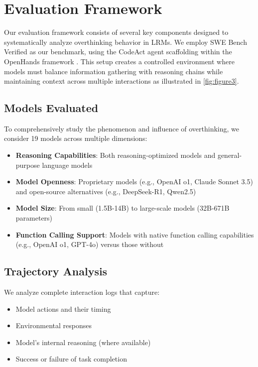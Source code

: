 \section{Evaluation Framework}
\label{sec:eval_framework}

Our evaluation framework consists of several key components designed to systematically analyze overthinking behavior in LRMs. We employ SWE Bench Verified \cite{jimenez2024swebenchlanguagemodelsresolve, swebench_verified} as our benchmark, using the CodeAct agent scaffolding \cite{wang2024executablecodeactionselicit} within the OpenHands framework \cite{wang2024openhandsopenplatformai}. This setup creates a controlled environment where models must balance information gathering with reasoning chains while maintaining context across multiple interactions as illustrated in \autoref{fig:figure3}.

\subsection{Models Evaluated}
To comprehensively study the phenomenon and influence of overthinking, we consider 19 models across multiple dimensions:
\begin{itemize}
    \item \textbf{Reasoning Capabilities}: Both reasoning-optimized models and general-purpose language models
    \item \textbf{Model Openness}: Proprietary models (e.g., OpenAI o1, Claude Sonnet 3.5) and open-source alternatives (e.g., DeepSeek-R1, Qwen2.5)
    \item \textbf{Model Size}: From small (1.5B-14B) to large-scale models (32B-671B parameters)
    \item \textbf{Function Calling Support}: Models with native function calling capabilities (e.g., OpenAI o1, GPT-4o) versus those without
\end{itemize}

\subsection{Trajectory Analysis}
We analyze complete interaction logs that capture:
\begin{itemize}
    \item Model actions and their timing
    \item Environmental responses
    \item Model's internal reasoning (where available)
    \item Success or failure of task completion
\end{itemize}


